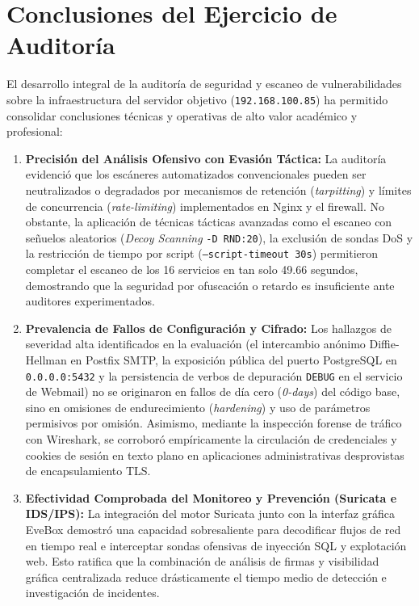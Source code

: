 
\section{Conclusiones del Ejercicio de Auditoría}

El desarrollo integral de la auditoría de seguridad y escaneo de vulnerabilidades sobre la infraestructura del servidor objetivo (\texttt{192.168.100.85}) ha permitido consolidar conclusiones técnicas y operativas de alto valor académico y profesional:

\begin{enumerate}
  \item \textbf{Precisión del Análisis Ofensivo con Evasión Táctica:} La auditoría evidenció que los escáneres automatizados convencionales pueden ser neutralizados o degradados por mecanismos de retención (\textit{tarpitting}) y límites de concurrencia (\textit{rate-limiting}) implementados en Nginx y el firewall. No obstante, la aplicación de técnicas tácticas avanzadas como el escaneo con señuelos aleatorios (\textit{Decoy Scanning} \texttt{-D RND:20}), la exclusión de sondas DoS y la restricción de tiempo por script (\texttt{--script-timeout 30s}) permitieron completar el escaneo de los 16 servicios en tan solo 49.66 segundos, demostrando que la seguridad por ofuscación o retardo es insuficiente ante auditores experimentados.
  
  \item \textbf{Prevalencia de Fallos de Configuración y Cifrado:} Los hallazgos de severidad alta identificados en la evaluación (el intercambio anónimo Diffie-Hellman en Postfix SMTP, la exposición pública del puerto PostgreSQL en \texttt{0.0.0.0:5432} y la persistencia de verbos de depuración \texttt{DEBUG} en el servicio de Webmail) no se originaron en fallos de día cero (\textit{0-days}) del código base, sino en omisiones de endurecimiento (\textit{hardening}) y uso de parámetros permisivos por omisión. Asimismo, mediante la inspección forense de tráfico con Wireshark, se corroboró empíricamente la circulación de credenciales y cookies de sesión en texto plano en aplicaciones administrativas desprovistas de encapsulamiento TLS.

  \item \textbf{Efectividad Comprobada del Monitoreo y Prevención (Suricata e IDS/IPS):} La integración del motor Suricata junto con la interfaz gráfica EveBox demostró una capacidad sobresaliente para decodificar flujos de red en tiempo real e interceptar sondas ofensivas de inyección SQL y explotación web. Esto ratifica que la combinación de análisis de firmas y visibilidad gráfica centralizada reduce drásticamente el tiempo medio de detección e investigación de incidentes.


\end{enumerate}
